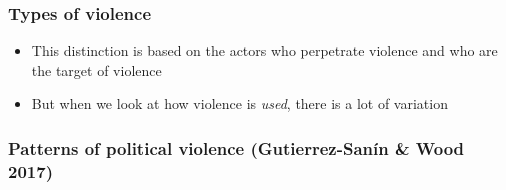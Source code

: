 \documentclass[aspectratio=43]{beamer}
\begin{document}
\begin{frame}
\frametitle{Types of violence}
\centering

\begin{itemize}[<+->]
  \item This distinction is based on the actors who perpetrate violence and who are the target of violence
  \item But when we look at how violence is \textit{used}, there is a lot of variation
\end{itemize}


\end{frame}

\begin{frame}
\frametitle{Patterns of political violence \hfill {\scriptsize (Gutierrez-Sanín \& Wood 2017)}}
\centering



\end{frame}
\end{document}
